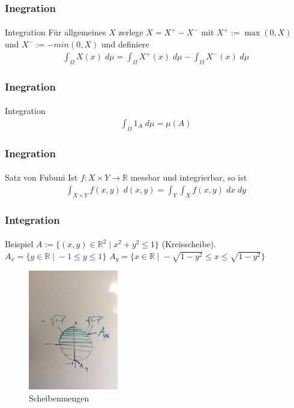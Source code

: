 \documentclass{beamer}
\begin{document}
\begin{frame}
    \frametitle{Inegration}
\framesubtitle{}

\begin{block}{Integration}
Für allgemeines $X$ zerlege $X = X^+ - X^-$ mit $X^+ := \max(0, X)$ und $X^- := -min(0, X)$ und definiere 
\begin{align*}
\int_\Omega X(x) \;  d\mu  = \int_\Omega X^+(x) \;  d\mu - \int_\Omega X^-(x) \;  d\mu
\end{align*}

\end{block}


 \end{frame}



\begin{frame}
    \frametitle{Inegration}
\framesubtitle{}

\begin{block}{Integration}
\begin{align*}
\int_\Omega 1_A \; d\mu = \mu(A) 
\end{align*}
\end{block}
 \end{frame}




\begin{frame}
    \frametitle{Inegration}
\framesubtitle{}

\begin{block}{Satz von Fubuni}
Ist $f:  X  \times Y \to \mathbb{R}$ messbar und integrierbar, so ist 
\begin{align*}
\int_{ X  \times Y} f (x,y) \;  d(x,y) =  \int_Y \int_X  f(x,y) \; dx \; dy
\end{align*}
\end{block}
 \end{frame}


\begin{frame}
    \frametitle{Integration}
\framesubtitle{}

    \begin{block}{Beispiel}
$A:= \{ (x,y) \in \mathbb{R}^2 \;  | \;  x^2 + y^2 \leq 1\}$ (Kreisscheibe). $A_x =  \{ y  \in \mathbb{R} \;  | \; -1 \leq y \leq 1\} $
$A_y =  \{ x  \in \mathbb{R} \;  | \;  -\sqrt{1 - y^2} \leq x \leq \sqrt{1 - y^2} \} $
\end{block}
\begin{figure}[htp]
      \centering
    \includegraphics[width=0.35\textwidth]{img/int}
      \caption{Scheibenmengen}
\end{figure}
 \end{frame}
\end{document}
